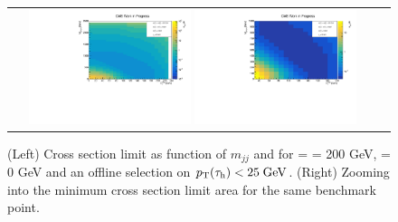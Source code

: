 \begin{figure}[tbh!]
	\centering
	\begin{tabular}{cc}
		\includegraphics[width=0.45\textwidth]{analysis/pics/JetInvMass_vs_MET_xsec_chi200_lsp000_taupt25.pdf}
		\includegraphics[width=0.45\textwidth]{analysis/pics/JetInvMass_vs_MET_xsec_chi200_lsp000_taupt25_zoom.pdf}
	\end{tabular}
	\caption{(Left) Cross section limit as function of $m_{jj}$ and \met for \charginopm = \neutralinotwo = 200 GeV, \neutralinoone = 0 GeV and an offline selection on $p_{\text{T}}(\tau_{\text{h}}) <  25\;\text{Ge}\kern-0.06667em\text{V}$. (Right) Zooming into the minimum cross section limit area for the same benchmark point.}
	\label{fig::JetInvMass_vs_MET_xsec_chi200_lsp000_taupt25}
\end{figure}

